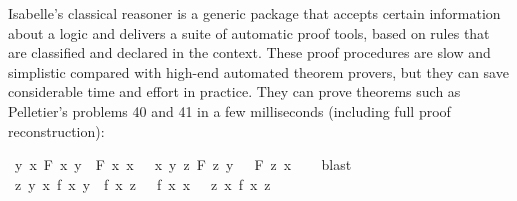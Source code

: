 \begin{isabellebody}
\begin{isamarkuptext}
  Isabelle's classical reasoner is a generic package that accepts
  certain information about a logic and delivers a suite of automatic
  proof tools, based on rules that are classified and declared in the
  context.  These proof procedures are slow and simplistic compared
  with high-end automated theorem provers, but they can save
  considerable time and effort in practice.  They can prove theorems
  such as Pelletier's \cite{pelletier86} problems 40 and 41 in a few
  milliseconds (including full proof reconstruction):%
\end{isamarkuptext}%
\isamarkuptrue%
\isamarkupfalse%
\ {}{}{}y{}\ {}x{}\ F\ x\ y\ {}\ F\ x\ x{}\ {}\ {}\ {}{}x{}\ {}y{}\ {}z{}\ F\ z\ y\ {}\ {}\ F\ z\ x{}{}\isanewline
%
\isadelimproof
\ \ %
\endisadelimproof
%
\isatagproof
{}\isamarkupfalse%
\ blast%
\endisatagproof
{\isafoldproof}%
%
\isadelimproof
\isanewline
%
\endisadelimproof
\isanewline
{}\isamarkupfalse%
\ {}{}{}z{}\ {}y{}\ {}x{}\ f\ x\ y\ {}\ f\ x\ z\ {}\ {}\ f\ x\ x{}\ {}\ {}\ {}{}z{}\ {}x{}\ f\ x\ z{}{}\isanewline

\end{isabellebody}
